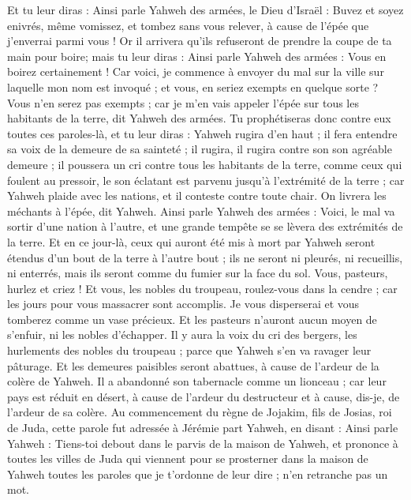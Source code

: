 \begin{multicols}{2}
Et tu leur diras : Ainsi parle Yahweh des armées, le Dieu d'Israël : Buvez et soyez enivrés, même vomissez, et tombez sans vous relever, à cause de l'épée que j'enverrai parmi vous !
Or il arrivera qu'ils refuseront de prendre la coupe de ta main pour boire; mais tu leur diras : Ainsi parle Yahweh des armées : Vous en boirez certainement !
Car voici, je commence à envoyer du mal sur la ville sur laquelle mon nom est invoqué ; et vous, en seriez exempts en quelque sorte ? Vous n'en serez pas exempts ; car je m'en vais appeler l'épée sur tous les habitants de la terre, dit Yahweh des armées.
Tu prophétiseras donc contre eux toutes ces paroles-là, et tu leur diras : Yahweh rugira d'en haut ; il fera entendre sa voix de la demeure de sa sainteté ; il rugira, il rugira contre son son agréable demeure ; il poussera un cri  contre tous les habitants de la terre, comme ceux qui foulent au pressoir,
le son éclatant est parvenu jusqu'à l'extrémité de la terre ; car Yahweh plaide avec les nations, et il conteste contre toute chair. On livrera les méchants à l'épée, dit Yahweh.
Ainsi parle Yahweh des armées : Voici, le mal va sortir d'une nation à l'autre, et une grande tempête se se lèvera des extrémités de la terre.
Et en ce jour-là, ceux qui auront été mis à mort par Yahweh seront étendus d'un bout de la terre à l'autre bout ; ils ne seront ni pleurés, ni recueillis, ni enterrés, mais ils seront comme du fumier sur la face du sol.
Vous, pasteurs, hurlez et criez ! Et vous, les nobles du troupeau, roulez-vous dans la cendre ; car les jours pour vous massacrer sont accomplis. Je vous disperserai et vous tomberez comme un vase précieux.
Et les pasteurs n'auront aucun moyen de s'enfuir, ni les nobles d'échapper. 
Il y aura la voix du cri des bergers, les hurlements des nobles du troupeau ; parce que Yahweh s'en va ravager leur pâturage.
Et les demeures paisibles seront abattues, à cause de l'ardeur de la colère de Yahweh.
Il a abandonné son tabernacle comme un lionceau ; car leur pays est réduit en désert, à cause de l'ardeur du destructeur et à cause, dis-je, de l'ardeur de sa colère.
\VerseOne{}Au commencement du règne de Jojakim, fils de Josias, roi de Juda, cette parole fut adressée à Jérémie part Yahweh, en disant :
Ainsi parle Yahweh : Tiens-toi debout dans le parvis de la maison de Yahweh, et prononce à toutes les villes de Juda qui viennent pour se prosterner dans la maison de Yahweh toutes les paroles que je t'ordonne de leur dire ; n'en retranche pas un mot.

\end{multicols}
